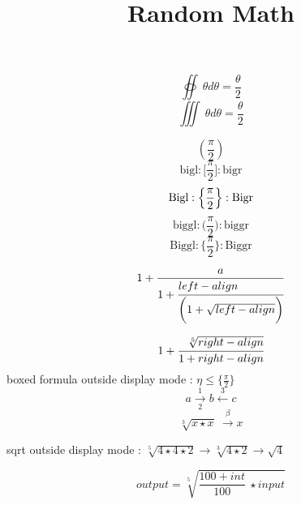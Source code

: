 \documentclass{article}
\title{Random Math}
\begin{document}
\maketitle
$$\oiint ~\theta{}d\theta = \frac{\theta}{2}$$
$$\iiint ~\theta{}d\theta = \frac{\theta}{2}$$

$$(\frac{\pi}{2})$$
$$\textrm{bigl} : \bigl[ \frac{\pi}{2} \bigr] : \textrm{bigr}$$
$$\textrm{Bigl} : \Bigl\{ \frac{\pi}{2}\Bigr\} : \textrm{Bigr}$$
$$\textrm{biggl} : \biggl( \frac{\pi}{2}\biggr) : \textrm{biggr}$$
$$\textrm{Biggl} : \Biggl\{ \frac{\pi}{2} \Biggr\} : \textrm{Biggr}$$

$$1+\frac{a}{1+\cfrac[l]{left-align}{\biggl(1 + \sqrt{left-align}\biggr)}}$$

$$1+\cfrac[r]{\sqrt[5]{right-align}}{1 + right-align}$$
boxed formula outside display mode : $\boxed{\eta \leq \bigl\{\frac{\pi}{2}\bigr\}}$
$$a \xrightarrow[2]{1} b \xleftarrow{3} c$$
$$\sqrt[3]{x \star x}~\xrightarrow{\beta} x$$

sqrt outside display mode : $\sqrt[5]{4 \star 4 \star 2} \to \sqrt[3]{4 \star 2}\to \sqrt{4}$

$$output = \sqrt[5]{\frac{100+int}{100} ~\star input}$$

\end{document}
